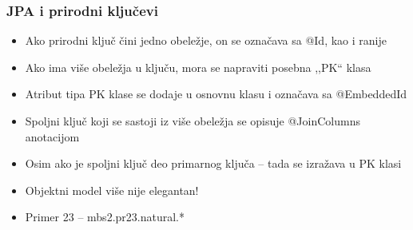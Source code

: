 \documentclass[compress]{beamer}
\begin{document}
\begin{frame}
  \frametitle{JPA i prirodni ključevi}
  \begin{itemize}
    \item Ako prirodni ključ čini jedno obeležje, on se označava sa @Id, kao i ranije
    \item Ako ima više obeležja u ključu, mora se napraviti posebna ,,PK`` klasa
    \item Atribut tipa PK klase se dodaje u osnovnu klasu i označava sa @EmbeddedId
  \end{itemize}

  \begin{itemize}
    \item Spoljni ključ koji se sastoji iz više obeležja se opisuje @JoinColumns anotacijom
    \item Osim ako je spoljni ključ deo primarnog ključa -- tada se izražava u PK klasi
    \item Objektni model više nije elegantan!
  \end{itemize}

  \begin{itemize}
    \item Primer 23 -- mbs2.pr23.natural.*
  \end{itemize}
\end{frame}
\end{document}
